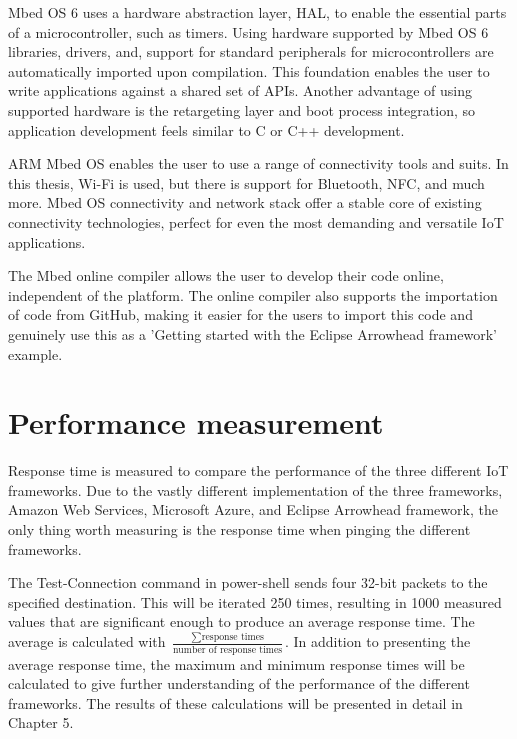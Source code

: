 Mbed OS 6 uses a hardware abstraction layer, HAL, to enable the essential parts of a microcontroller, such as timers.
Using hardware supported by Mbed OS 6 libraries, drivers, and, support for standard peripherals for microcontrollers are automatically imported upon compilation.
This foundation enables the user to write applications against a shared set of APIs.
Another advantage of using supported hardware is the retargeting layer and boot process integration, so application development feels similar to C or C++ development.

ARM Mbed OS enables the user to use a range of connectivity tools and suits. In this thesis, Wi-Fi is used, but there is support for Bluetooth, NFC, and much more.
Mbed OS connectivity and network stack offer a stable core of existing connectivity technologies, perfect for even the most demanding and versatile IoT applications. 

The Mbed online compiler allows the user to develop their code online, independent of the platform. 
The online compiler also supports the importation of code from GitHub, making it easier for the users to import this code and genuinely use this as a 'Getting started with the Eclipse Arrowhead framework' example. 


\section{Performance measurement}
Response time is measured to compare the performance of the three different IoT frameworks.  
Due to the vastly different implementation of the three frameworks, Amazon Web Services, Microsoft Azure, and Eclipse Arrowhead framework, the only thing worth measuring is the response time when pinging the different frameworks.

The Test-Connection command in power-shell sends four 32-bit packets to the specified destination. 
This will be iterated 250 times, resulting in 1000 measured values that are significant enough to produce an average response time.
The average is calculated with $\frac{\sum \text{response times}}{\text{number of response times}}$.
In addition to presenting the average response time, the maximum and minimum response times will be calculated to give further understanding of the performance of the different frameworks. 
The results of these calculations will be presented in detail in Chapter 5.



 
